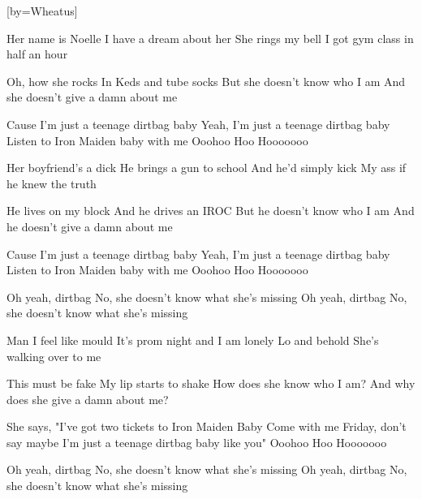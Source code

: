  

[by=Wheatus]




\beginverse
Her name is Noelle  \brk  I have a dream about her
She rings my bell  \brk  I got gym class in half an hour

Oh, how she rocks  \brk  In Keds and tube socks
But she doesn't know who I am  \brk  And she doesn't give a damn about me
\endverse

\beginchorus
Cause I'm just a teenage dirtbag baby
Yeah, I'm just a teenage dirtbag baby
Listen to Iron Maiden baby with me
Ooohoo Hoo Hooooooo
\endchorus

\beginverse
Her boyfriend's a dick  \brk  He brings a gun to school
And he'd simply kick  \brk  My ass if he knew the truth

He lives on my block  \brk  And he drives an IROC
But he doesn't know who I am  \brk  And he doesn't give a damn about me
\endverse

\beginchorus
Cause I'm just a teenage dirtbag baby
Yeah, I'm just a teenage dirtbag baby
Listen to Iron Maiden baby with me
Ooohoo Hoo Hooooooo

Oh yeah, dirtbag
No, she doesn't know what she's missing
Oh yeah, dirtbag
No, she doesn't know what she's missing
\endchorus

\beginverse
Man I feel like mould  \brk  It's prom night and I am lonely
Lo and behold  \brk  She's walking over to me

This must be fake  \brk  My lip starts to shake
How does she know who I am?  \brk  And why does she give a damn about me?

She says, "I've got two tickets to Iron Maiden Baby
Come with me Friday, don't say maybe
I'm just a teenage dirtbag baby like you"
Ooohoo Hoo Hooooooo
\endverse

\beginchorus
Oh yeah, dirtbag
No, she doesn't know what she's missing
Oh yeah, dirtbag
No, she doesn't know what she's missing
\endchorus


\endsong
